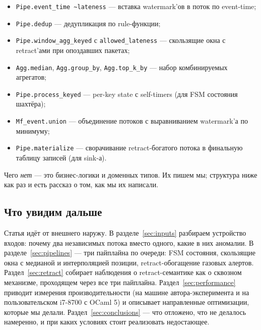 \begin{itemize}
\item \texttt{Pipe.event\_time \textasciitilde lateness} ---
вставка watermark'ов в поток по event-time;
\item \texttt{Pipe.dedup} --- дедупликация по rule-функции;
\item \texttt{Pipe.window\_agg\_keyed} с
\texttt{allowed\_lateness} --- скользящие окна с retract'ами при
опоздавших пакетах;
\item \texttt{Agg.median}, \texttt{Agg.group\_by},
\texttt{Agg.top\_k\_by} --- набор комбинируемых агрегатов;
\item \texttt{Pipe.process\_keyed} --- per-key state с self-timers
(для FSM состояния шахтёра);
\item \texttt{Mf\_event.union} --- объединение потоков с
выравниванием watermark'а по минимуму;
\item \texttt{Pipe.materialize} --- сворачивание retract-богатого
потока в финальную таблицу записей (для sink-а).
\end{itemize}

Чего \emph{нет} --- это бизнес-логики и доменных типов. Их пишем мы;
структура ниже как раз и есть рассказ о том, как мы их написали.

\subsection{Что увидим дальше}

Статья идёт от внешнего наружу. В разделе~\ref{sec:inputs}
разбираем устройство входов: почему два независимых потока вместо
одного, какие в них аномалии. В разделе~\ref{sec:pipelines} --- три
пайплайна по очереди: FSM состояния, скользящие окна с медианой и
интерполяцией позиции, retract-обогащение газовых алертов.
Раздел~\ref{sec:retract} собирает наблюдения о retract-семантике как
о сквозном механизме, проходящем через все три пайплайна.
Раздел~\ref{sec:performance} приводит измерения производительности
(на машине автора-эксперимента и на пользовательском i7-8700 с OCaml
5) и описывает направленные оптимизации, которые мы делали.
Раздел~\ref{sec:conclusions} --- что отложено, что не делалось
намеренно, и при каких условиях стоит реализовать недостающее.

